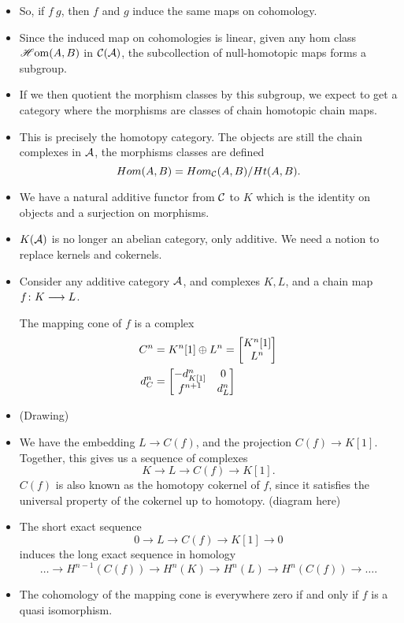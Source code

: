 \documentclass[a4paper]{article}
\begin{document}
\begin{itemize}
    \item So, if $f ~ g$, then $f$ and $g$ induce the same maps on cohomology.
    \item Since the induced map on cohomologies is linear, given any hom class $\operatorname{\mathscr{H}om}(A,B)$ in $\mathcal{C}(\mathcal{A})$, the subcollection of null-homotopic maps forms a subgroup.
    \item If we then quotient the morphism classes by this subgroup, we expect to get a category where the morphisms are classes of chain homotopic chain maps.
    \item This is precisely the homotopy category. The objects are still the chain complexes in $\mathcal{A}$, the morphisms classes are defined
        \[
            Hom(A, B) = Hom_{\mathcal{C}}(A,B)/ Ht(A,B).
        \]
    \item We have a natural additive functor from $\mathcal{C}$ to $K$ which is the identity on objects and a surjection on morphisms.
    \item $K(\mathcal{A})$ is no longer an abelian category, only additive. We need a notion to replace kernels and cokernels.
    \item Consider any additive category $\mathcal{A}$, and complexes $K, L$, and a chain map $f\colon K\longrightarrow L$.
        \begin{Definition}
            The mapping cone of $f$ is a complex
            \begin{align*}
                C^n &= K^n[1] \oplus L^n = \begin{bmatrix}K^n[1]\\ L^n\end{bmatrix} \\
                d^n_C &= \begin{bmatrix} - d^n_{K[1]} & 0 \\ f^{n+1} & d^n_L\end{bmatrix}
            \end{align*}
        \end{Definition}
    \item (Drawing)
    \item
        We have the embedding $L \to C(f)$, and the projection $C(f) \to K[1]$. Together, this gives us a sequence of complexes
        \[
            K \to L \to C(f) \to K[1].
        \]
        $C(f)$ is also known as the homotopy cokernel of $f$, since it satisfies the universal property of the cokernel up to homotopy. (diagram here)
    \item The short exact sequence
        \[
            0 \to L \to C(f) \to K[1] \to 0
        \]
        induces the long exact sequence in homology
        \[
            \dots \to H^{n-1}(C(f)) \to H^n(K) \to H^n(L) \to H^{n}(C(f)) \to \dots.
        \]
    \item The cohomology of the mapping cone is everywhere zero if and only if $f$ is a quasi isomorphism.

\end{itemize}
\end{document}
